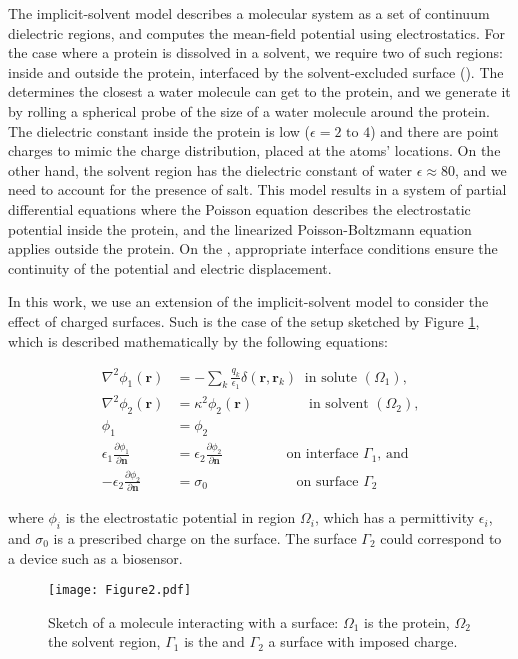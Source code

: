 
The implicit-solvent model describes a molecular system as a set of continuum dielectric regions, and computes the mean-field potential using electrostatics. 
For the case where a protein is dissolved in a solvent, we require two of such regions: inside and outside the protein, interfaced by the solvent-excluded surface (\ses). 
The \ses determines the closest a water molecule can get to the protein, and we generate it by rolling a spherical probe of the size of a water molecule around the protein. 
The dielectric constant inside the protein is low ($\epsilon= 2\text{ to }4$) and there are point charges to mimic the charge distribution, placed at the atoms' locations. On the other hand, the solvent region has the dielectric constant of water $\epsilon \approx 80$, and we need to account for the presence of salt. 
This model results in a system of partial differential equations where the Poisson equation describes the electrostatic potential inside the protein, and the linearized Poisson-Boltzmann equation applies outside the protein. On the \ses, appropriate interface conditions ensure the continuity of the potential and electric displacement.

In this work, we use an extension of the implicit-solvent model to consider the effect of charged surfaces. Such is the case of the setup sketched by Figure \ref{fig:molecule_surface}, which is described mathematically by the following equations:


\begin{align} \label{eq:pde}
\nabla^2 \phi_1(\mathbf{r}) &= - \sum_k \frac{q_k}{\epsilon_1} \delta(\mathbf{r},\mathbf{r}_k) \ \text{ in solute $(\Omega_1)$,}  \nonumber \\ 
\nabla^2\phi_2 (\mathbf{r}) &= \kappa^2 \phi_2(\mathbf{r}) \quad \qquad \ \ \ \text{ in solvent $(\Omega_2)$,}  \nonumber \\ 
\phi_1 &=\phi_2 \nonumber \\ 
\epsilon_1 \frac{\partial \phi_1}{\partial \mathbf{n}} &= \epsilon_2 \frac{\partial \phi_2}{\partial \mathbf{n}}  \ \qquad \qquad \text{ on interface $\Gamma_1$, and} \nonumber \\
-\epsilon_2 \frac{\partial \phi_2}{\partial \mathbf{n}} &= \sigma_0 \qquad \qquad \qquad \text{ on surface $\Gamma_2$} 
\end{align}

\noindent where $\phi_i$ is the electrostatic potential in region $\Omega_i$, which has a permittivity $\epsilon_i$, and $\sigma_0$ is a prescribed charge on the surface. The surface $\Gamma_2$ could correspond to a device such as a biosensor.

\begin{figure}
   \texttt{[image: Figure2.pdf]} 
   \caption{Sketch of a molecule interacting with a surface: $\Omega_1$ is the protein, $\Omega_2$ the solvent region, $\Gamma_1$ is the  \ses and $\Gamma_2$ a surface with imposed charge.}
   \label{fig:molecule_surface}
\end{figure}
